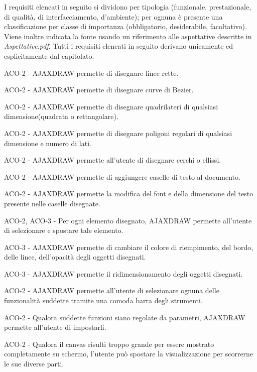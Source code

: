 \label{listarequisiti}
I requisiti elencati in seguito si dividono per tipologia (funzionale, prestazionale, di qualit\`a, di interfacciamento, d'ambiente); 
per ognuna \`e presente una classificazione per classe di importanza (obbligatorio, desiderabile, facoltativo). Viene inoltre indicata la fonte usando un riferimento alle aspettative descritte in \textit{Aspettative.pdf}.
Tutti i requisiti elencati in seguito derivano unicamente ed esplicitamente dal capitolato.
\begin{elenconumerato}{\subsubsecindent}
\item{ACO-2 - AJAXDRAW permette di disegnare linee rette.}
\item{ACO-2 - AJAXDRAW permette di disegnare curve di Bezier.}
\item{ACO-2 - AJAXDRAW permette di disegnare quadrilateri di qualsiasi dimensione(quadrata o rettangolare).}
\item{ACO-2 - AJAXDRAW permette di disegnare poligoni regolari di qualsiasi dimensione e numero di lati.}
\item{ACO-2 - AJAXDRAW permette all'utente di disegnare cerchi o ellissi.}
\item{ACO-2 - AJAXDRAW permette di aggiungere caselle di testo al documento. }
\item{ACO-2 - AJAXDRAW permette la modifica del font e della dimensione del testo presente nelle caselle disegnate.}
\item{ACO-2, ACO-3 - Per ogni elemento disegnato, AJAXDRAW permette all'utente di selezionare e spostare tale elemento.}
\item{ACO-3 - AJAXDRAW permette di cambiare il colore di riempimento, del bordo, delle linee, dell'opacit\`a degli oggetti disegnati.}
\item{ACO-3 - AJAXDRAW permette il ridimensionamento degli oggetti disegnati.}
\item{ACO-2 - AJAXDRAW permette all'utente di selezionare ognuna delle funzionalit\`a suddette tramite una comoda barra degli strumenti.}
\item{ACO-2 - Qualora suddette funzioni siano regolate da parametri, AJAXDRAW permette all'utente di impostarli.}
\item {ACO-2 - Qualora il canvas risulti troppo grande per essere mostrato completamente su schermo, l'utente pu\`o spostare la visualizzazione per scorrerne le sue diverse parti.}

\end{elenconumerato}
